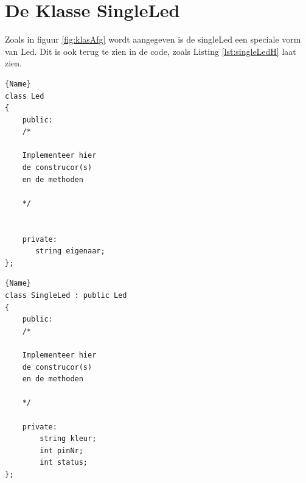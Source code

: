 \section{De Klasse SingleLed}

Zoals in figuur \ref{fig:klasAfg} wordt aangegeven is de singleLed een speciale vorm van Led. Dit is ook terug te zien in de code, zoals Listing \ref{lst:singleLedH} laat zien.

\noindent\begin{minipage}{.45\textwidth}
\begin{lstlisting}[caption=LED declaratie file(.h),frame=tlrb,label={lst:ledBaseH}]{Name}
class Led
{
	public:
	/*
	
	Implementeer hier 
	de construcor(s) 
	en de methoden
	
	*/
	
	
	private:
       string eigenaar;
};
\end{lstlisting}
\end{minipage}\hfill
\begin{minipage}{.45\textwidth}
\begin{lstlisting}[caption=SingleLed declaratie file(.h),frame=tlrb,label={lst:singleLedH}]{Name}
class SingleLed : public Led
{
	public:
	/*
	
	Implementeer hier 
	de construcor(s) 
	en de methoden
	
	*/
	
	private:
        string kleur;
	    int pinNr;
	    int status;
};
\end{lstlisting}
\end{minipage}
